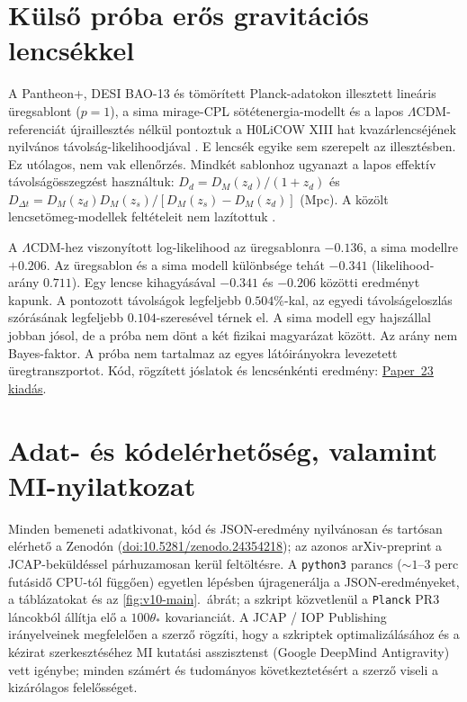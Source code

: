 \documentclass[11pt,a4paper]{article}
\begin{document}
\section{K\"uls\H{o} pr\'oba er\H{o}s gravit\'aci\'os lencs\'ekkel}
A Pantheon+, DESI BAO-13 \'es t\"om\"or\'itett Planck-adatokon
illesztett line\'aris \"uregsablont ($p=1$), a sima mirage-CPL
s\"ot\'etenergia-modellt \'es a lapos $\Lambda$CDM-referenci\'at
\'ujrailleszt\'es n\'elk\"ul pontoztuk a H0LiCOW XIII hat
kvaz\'arlencs\'ej\'enek nyilv\'anos t\'avols\'ag-likelihoodj\'aval
\cite{Wong2020H0LiCOW}. E lencs\'ek egyike sem szerepelt az
illeszt\'esben. Ez ut\'olagos, nem vak ellen\H{o}rz\'es.
Mindk\'et sablonhoz ugyanazt a lapos effekt\'iv t\'avols\'ag\"osszegz\'est
haszn\'altuk: $D_d=D_M(z_d)/(1+z_d)$ \'es
$D_{\Delta t}=D_M(z_d)D_M(z_s)/[D_M(z_s)-D_M(z_d)]$ (Mpc).
A k\"oz\"olt lencset\"omeg-modellek felt\'eteleit nem laz\'itottuk
\cite{Birrer2020TDCOSMO}.

A $\Lambda$CDM-hez viszony\'itott log-likelihood az \"uregsablonra
$-0.136$, a sima modellre $+0.206$. Az \"uregsablon \'es a sima
modell k\"ul\"onbs\'ege teh\'at $-0.341$ (likelihood-ar\'any $0.711$).
Egy lencse kihagy\'as\'aval $-0.341$ \'es $-0.206$ k\"oz\"otti
eredm\'enyt kapunk. A pontozott t\'avols\'agok legfeljebb $0.504\%$-kal,
az egyedi t\'avols\'ageloszl\'as sz\'or\'as\'anak legfeljebb $0.104$-szeres\'evel
t\'ernek el. A sima modell egy hajsz\'allal jobban j\'osol, de a
pr\'oba nem d\"ont a k\'et fizikai magyar\'azat k\"oz\"ott. Az ar\'any
nem Bayes-faktor. A pr\'oba nem tartalmaz az egyes l\'at\'oir\'anyokra
levezetett \"uregtranszportot. K\'od, r\"ogz\'itett j\'oslatok \'es
lencs\'enk\'enti eredm\'eny:
\href{https://github.com/tau-core-research/tau-core-void-clocks-des2026-galactic-dip-paper23/releases/tag/v15.1-lens-holdout}{Paper~23 kiad\'as}.

\section*{Adat- \'es k\'odel\'erhet\H{o}s\'eg, valamint MI-nyilatkozat}
{\sloppy Minden bemeneti adatkivonat, k\'od \'es JSON-eredm\'eny nyilv\'anosan \'es tart\'osan el\'erhet\H{o} a Zenod\'on (\href{https://doi.org/10.5281/zenodo.24354218}{doi:10.5281/zenodo.24354218}); az azonos arXiv-preprint a JCAP-bek\"uld\'essel p\'arhuzamosan ker\"ul felt\"olt\'esre. A \texttt{python3}  parancs ($\sim 1\text{--}3$ perc fut\'asid\H{o} CPU-t\'ol f\"ugg\H{o}en) egyetlen l\'ep\'esben \'ujragener\'alja a JSON-eredm\'enyeket, a t\'abl\'azatokat \'es az \ref{fig:v10-main}.\ \'abr\'at; a  szkript k\"ozvetlen\"ul a \texttt{Planck} PR3 l\'ancokb\'ol \'all\'itja el\H{o} a $100\theta_*$ kovarianci\'at. A JCAP / IOP Publishing ir\'anyelveinek megfelel\H{o}en a szerz\H{o} r\"ogz\'iti, hogy a szkriptek optimaliz\'al\'as\'ahoz \'es a k\'ezirat szerkeszt\'es\'ehez MI kutat\'asi asszisztenst (Google DeepMind Antigravity) vett ig\'enybe; minden sz\'am\'ert \'es tudom\'anyos k\"ovetkeztet\'es\'ert a szerz\H{o} viseli a kiz\'ar\'olagos felel\H{o}ss\'eget.\par}
\end{document}
